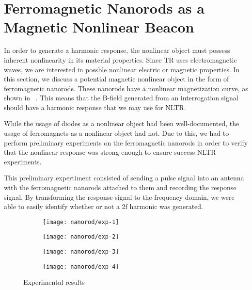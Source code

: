 \chapter{Ferromagnetic Nanorods as a Magnetic Nonlinear Beacon}

\label{ch:nanorod}

In order to generate a harmonic response, the nonlinear object must possess inherent nonlinearity in its material properties. Since TR uses electromagnetic waves, we are interested in possble nonlinear electric or magnetic properties. In this section, we discuss a potential magnetic nonlinear object in the form of ferromagnetic nanorods. These nanorods have a nonlinear magnetization curve, as shown in ~. This means that the B-field generated from an interrogation signal should have a harmonic response that we may use for NLTR. 

While the usage of diodes as a nonlinear object had been well-documented, the usage of ferromagnets as a nonlinear object had not. Due to this, we had to perform preliminary experiments on the ferromagnetic nanorods in order to verify that the nonlinear response was strong enough to ensure success NLTR experiments. 

This preliminary expertiment consisted of sending a pulse signal into an antenna with the ferromagnetic nanorods attached to them and recording the response signal. By transforming the response signal to the frequency domain, we were able to easily identify whether or not a 2f harmonic was generated. 

\begin{figure}[h!]
    \centering
    \begin{subfigure}{0.45\textwidth}
        \centering
        \texttt{[image: nanorod/exp-1]}
        \caption[]{}
        \label{fig:nanorod-exp-1}
    \end{subfigure}
        \begin{subfigure}{0.45\textwidth}
        \centering
        \texttt{[image: nanorod/exp-2]}
        \caption[]{}
        \label{fig:nanorod-exp-2}
    \end{subfigure}
        \begin{subfigure}{0.45\textwidth}
        \centering
        \texttt{[image: nanorod/exp-3]}
        \caption[]{}
        \label{fig:nanorod-exp-3}
    \end{subfigure}
        \begin{subfigure}{0.45\textwidth}
        \centering
        \texttt{[image: nanorod/exp-4]}
        \caption[]{}
        \label{fig:nanorod-exp-4}
    \end{subfigure}
    \caption[Ferromagnetic nanorod experimental results]{Experimental results}
    \label{fig:nanorod-results}
\end{figure}

